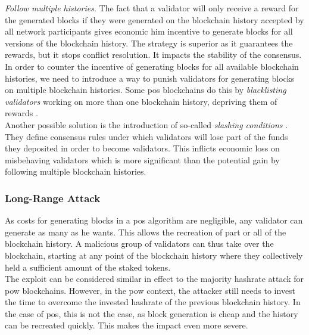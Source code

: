\documentclass[12pt,a4paper]{article}
\begin{document}
\textit{Follow multiple histories}. The fact that a \gls{validator} will only receive a \gls{reward} for the generated \glspl{block} if they were generated on the blockchain history accepted by all network participants gives economic him incentive to generate blocks for all versions of the blockchain history. The strategy is superior as it guarantees the \glspl{reward}, but it stops conflict resolution. It impacts the stability of the \gls{consensus}.\\

In order to counter the incentive of generating \glspl{block} for all available blockchain histories, we need to introduce a way to punish \glspl{validator} for generating blocks on multiple blockchain histories. Some \acrshort{pos} \glspl{blockchain} do this by \textit{blacklisting \glspl{validator}} working on more than one blockchain history, depriving them of \glspl{reward} \cite{secure}.\\

Another possible solution is the introduction of so-called \textit{slashing conditions} \cite{casper}. They define consensus rules under which validators will lose part of the funds they deposited in order to become \glspl{validator}. This inflicts economic loss on misbehaving \glspl{validator} which is more significant than the potential gain by following multiple blockchain histories.\\

\subsubsection{Long-Range Attack}

As costs for generating \glspl{block} in a \acrshort{pos} algorithm are negligible, any \gls{validator} can generate as many as he wants. This allows the recreation of part or all of the blockchain history. A malicious group of \glspl{validator} can thus take over the \gls{blockchain}, starting at any point of the blockchain history where they collectively held a sufficient amount of the staked tokens.\\

The exploit can be considered similar in effect to the majority hashrate attack for \acrshort{pow} \glspl{blockchain}. However, in the \acrshort{pow} context, the attacker still needs to invest the time to overcome the invested \gls{hashrate} of the previous blockchain history. In the case of \acrshort{pos}, this is not the case, as block generation is cheap and the history can be recreated quickly. This makes the impact even more severe.\\
\end{document}
